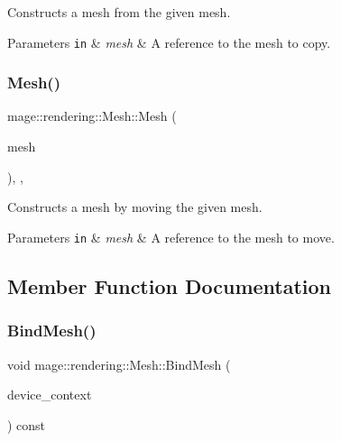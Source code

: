 Constructs a mesh from the given mesh.


\begin{DoxyParams}[1]{Parameters}
\mbox{\tt in}  & {\em mesh} & A reference to the mesh to copy. \\
\hline
\end{DoxyParams}
\mbox{\label{classmage_1_1rendering_1_1_mesh_aeb090ec9531823157f010a70a9dabf45}} 
\subsubsection{\texorpdfstring{Mesh()}{Mesh()}\hspace{0.1cm}{\footnotesize\ttfamily [3/3]}}
{\footnotesize\ttfamily mage\+::rendering\+::\+Mesh\+::\+Mesh (\begin{DoxyParamCaption}\item[{\mbox{\hyperlink{classmage_1_1rendering_1_1_mesh}{Mesh}} \&\&}]{mesh }\end{DoxyParamCaption})\hspace{0.3cm}{\ttfamily [protected]}, {\ttfamily [default]}, {\ttfamily [noexcept]}}

Constructs a mesh by moving the given mesh.


\begin{DoxyParams}[1]{Parameters}
\mbox{\tt in}  & {\em mesh} & A reference to the mesh to move. \\
\hline
\end{DoxyParams}


\subsection{Member Function Documentation}
\mbox{\label{classmage_1_1rendering_1_1_mesh_a36999cc548e68c3ad0c8d348ad0ead4f}} 
\subsubsection{\texorpdfstring{Bind\+Mesh()}{BindMesh()}\hspace{0.1cm}{\footnotesize\ttfamily [1/2]}}
{\footnotesize\ttfamily void mage\+::rendering\+::\+Mesh\+::\+Bind\+Mesh (\begin{DoxyParamCaption}\item[{I\+D3\+D11\+Device\+Context \&}]{device\+\_\+context }\end{DoxyParamCaption}) const\hspace{0.3cm}{\ttfamily [noexcept]}}

